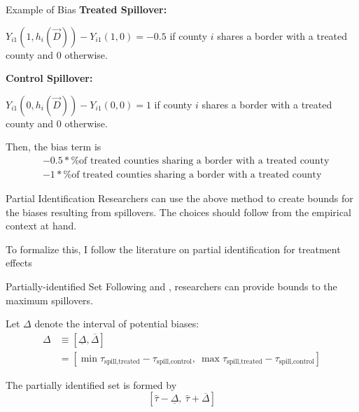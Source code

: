 \documentclass[aspectratio=43]{beamer}
\begin{document}
\begin{frame}{Example of Bias}
    \textbf{Treated Spillover:}
    
    $Y_{i1}(1, h_i(\vec{D})) - Y_{i1}(1, 0) = -0.5$ if county $i$ shares a border with a treated county and $0$ otherwise.
        
    \textbf{Control Spillover:}
    
    $Y_{i1}(0, h_i(\vec{D})) - Y_{i1}(0, 0) = 1$ if county $i$ shares a border with a treated county and $0$ otherwise.
        
    Then, the bias term is 
    \begin{align*}
        &-0.5 * \text{\% of treated counties sharing a border with a treated county} \\
        &-1 * \text{\% of treated counties sharing a border with a treated county}
    \end{align*}
\end{frame}

\begin{frame}{Partial Identification}
    Researchers can use the above method to create bounds for the biases resulting from spillovers. The choices should follow from the empirical context at hand.

    To formalize this, I follow the literature on partial identification for treatment effects
    \begin{citecolor}
    \end{citecolor}
\end{frame}

\begin{frame}{Partially-identified Set}
    Following \citet{Rambachan_Roth_2020} and \citet{Manski_Pepper_2018}, researchers can provide bounds to the maximum spillovers. 

    Let $\Delta$ denote the interval of potential biases: 
    \begin{align*}
        \Delta &\equiv [\underline{\Delta}, \overline{\Delta}] \\
        &= \left[ \min \tau_{\text{spill,treated}} - \tau_{\text{spill,control}}, \ \max \tau_{\text{spill,treated}} - \tau_{\text{spill,control}} \right] 
    \end{align*}

    The partially identified set is formed by \[ 
        \left[\hat{\tau} - \underline{\Delta} , \ \hat{\tau} + \overline{\Delta} \right]    
    \]

\end{frame}
\end{document}
